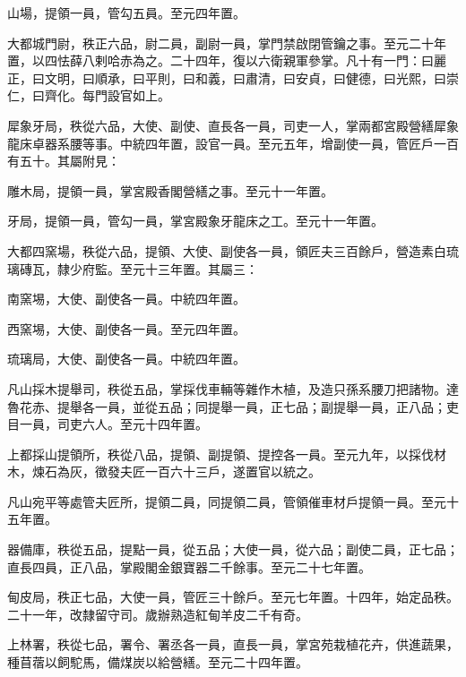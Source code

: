\begin{pinyinscope}
 山場，提領一員，管勾五員。至元四年置。



 大都城門尉，秩正六品，尉二員，副尉一員，掌門禁啟閉管鑰之事。至元二十年置，以四怯薛八剌哈赤為之。二十四年，復以六衛親軍參掌。凡十有一門：曰麗正，曰文明，曰順承，曰平則，曰和義，曰肅清，曰安貞，曰健德，曰光熙，曰崇仁，曰齊化。每門設官如上。



 犀象牙局，秩從六品，大使、副使、直長各一員，司吏一人，掌兩都宮殿營繕犀象龍床卓器系腰等事。中統四年置，設官一員。至元五年，增副使一員，管匠戶一百有五十。其屬附見：



 雕木局，提領一員，掌宮殿香閣營繕之事。至元十一年置。



 牙局，提領一員，管勾一員，掌宮殿象牙龍床之工。至元十一年置。



 大都四窯場，秩從六品，提領、大使、副使各一員，領匠夫三百餘戶，營造素白琉璃磚瓦，隸少府監。至元十三年置。其屬三：



 南窯埸，大使、副使各一員。中統四年置。



 西窯埸，大使、副使各一員。至元四年置。



 琉璃局，大使、副使各一員。中統四年置。



 凡山採木提舉司，秩從五品，掌採伐車輛等雜作木植，及造只孫系腰刀把諸物。達魯花赤、提舉各一員，並從五品；同提舉一員，正七品；副提舉一員，正八品；吏目一員，司吏六人。至元十四年置。



 上都採山提領所，秩從八品，提領、副提領、提控各一員。至元九年，以採伐材木，煉石為灰，徵發夫匠一百六十三戶，遂置官以統之。



 凡山宛平等處管夫匠所，提領二員，同提領二員，管領催車材戶提領一員。至元十五年置。



 器備庫，秩從五品，提點一員，從五品；大使一員，從六品；副使二員，正七品；直長四員，正八品，掌殿閣金銀寶器二千餘事。至元二十七年置。



 甸皮局，秩正七品，大使一員，管匠三十餘戶。至元七年置。十四年，始定品秩。二十一年，改隸留守司。歲辦熟造紅甸羊皮二千有奇。



 上林署，秩從七品，署令、署丞各一員，直長一員，掌宮苑栽植花卉，供進蔬果，種苜蓿以飼駝馬，備煤炭以給營繕。至元二十四年置。




\end{pinyinscope}
